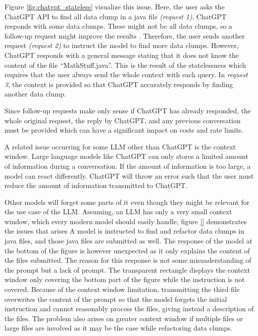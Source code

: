 Figure \ref{fig:chatgpt_stateless} visualize this issue. Here, the user asks the ChatGPT API to find all data clump in a java file \textit{(request 1)}. ChatGPT responds with some data clumps. These might not be all data clumps, so a follow-up request might improve the results \cite{10062688}. Therefore, the user sends another request \textit{(request 2)} to instruct the model to find more data clumps. However, ChatGPT responds with a general message stating that it does not know the content of the file \enquote{MathStuff.java}. This is the result of the statelessness which requires that the user always send the whole context with each query. In \textit{request 3}, the context is provided so that ChatGPT accurately responds by finding another data clump.

Since follow-up requests make only sense if ChatGPT has already responded, the whole original request, the reply by ChatGPT, and any previous conversation must be provided which can have a significant impact on costs and rate limits. 

A related issue occurring for some \acs{LLM} other than ChatGPT is the context window. Large language models like ChatGPT can only stores a limited amount of information during a conversation. If the amount of information is too large,  a model can react differently. ChatGPT will throw an error such that the user must reduce the amount of information transmitted to ChatGPT.

Other models will forget some parts of it even though they might be relevant for the use case of the \ac{LLM}.
Assuming, an \ac{LLM} has only a very small context window, which every modern model should easily handle, figure \ref{} demonstrates the issues that arises  A model is instructed to find and refactor data clumps in java files, and those java files are submitted as well. The response of the model at the bottom of the figure is however unexpected as it only explains the content of the files submitted. The reason for this response is not some misunderstanding of the prompt but a lack of prompt. The transparent rectangle displays the context window only covering the bottom part of the figure while the instruction is not covered.  
Because of the context window limitation, transmitting the third file overwrites the content of the prompt so that the model forgets the initial instruction and cannot reasonably process the files, giving instead a description of the files. The problem also arises on greater context window if multiple files or large files are involved as it may be the case while refactoring data clumps.



